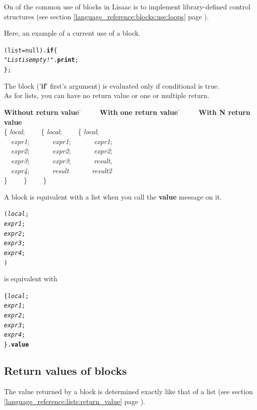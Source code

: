 \documentclass[11pt]{mybook}
\begin{document}
On of the common use of blocks in Lisaac is to implement library-defined  
control structures (see section \ref{language_reference:blocks:use:loops} page
\pageref{language_reference:blocks:use:loops}). 

Here, an example of a current use of a block.

\begin{alltt}
  (list = {\sc{}null}).{\bf{}if} \{
    {\it{}"List is empty !"}.{\bf{}print};
  \};
\end{alltt}
The block ('{\bf{}if}' first's argument) is evaluated only if conditional is true.\\

As for lists, you can have no return value or one or multiple return.
\begin{tabbing}
{\bf{}Without return value} \= ~~~~ {\bf{}With one return value} \= ~~~~ {\bf{}With N return value}\\
\{ {\it{}local};            \> ~~~~\{ {\it{}local};               \> ~~~~\{ {\it{}local};\\
~~{\it{}expr1};             \> ~~~~~~{\it{}expr1};                \> ~~~~~~{\it{}expr1};\\
~~{\it{}expr2};             \> ~~~~~~{\it{}expr2};                \> ~~~~~~{\it{}expr2};\\
~~{\it{}expr3};             \> ~~~~~~{\it{}expr3};                \> ~~~~~~{\it{}result},\\
~~{\it{}expr4};             \> ~~~~~~{\it{}result}                \> ~~~~~~{\it{}result2}\\
\}                          \> ~~~~\}                             \> ~~~~\}
\end{tabbing}

A block is equivalent with a list when you call the {\bf{}value} message on it.
\begin{alltt}
( {\it{}local};
  {\it{}expr1};
  {\it{}expr2};
  {\it{}expr3};
  {\it{}expr4};
)
\end{alltt}
is equivalent with
\begin{alltt}
\{ {\it{}local};
  {\it{}expr1};
  {\it{}expr2};
  {\it{}expr3};
  {\it{}expr4};
\}.{\bf{}value}
\end{alltt}

\subsection{Return values of blocks}
\label{language_reference:blocks:return_value}
The value returned by a block is determined exactly like that of a
list (see section \ref{language_reference:lists:return_value} page
\pageref{language_reference:lists:return_value}). 
\end{document}
